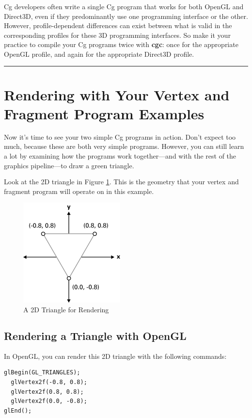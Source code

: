 \documentclass{book}
\begin{document}
Cg developers often write a single Cg program that works for both OpenGL and Direct3D, even if they predominantly use one programming interface or the other. However, profile-dependent differences can exist between what is valid in the corresponding profiles for these 3D programming interfaces. So make it your practice to compile your Cg programs twice with \textbf{cgc}: once for the appropriate OpenGL profile, and again for the appropriate Direct3D profile.
\hrule

\section{Rendering with Your Vertex and Fragment Program Examples}

Now it's time to see your two simple Cg programs in action. Don't expect too much, because these are both very simple programs. However, you can still learn a lot by examining how the programs work together—and with the rest of the graphics pipeline—to draw a green triangle.

Look at the 2D triangle in Figure \ref{fig:2-4}. This is the geometry that your vertex and fragment program will operate on in this example.

\begin{figure}
    \centering
    \includegraphics[width=0.5\linewidth]{Images/fig2_4.jpg}
    \caption{A 2D Triangle for Rendering}
    \label{fig:2-4}
\end{figure}

\subsection{Rendering a Triangle with OpenGL}

In OpenGL, you can render this 2D triangle with the following commands:

\FloatBarrier
\begin{lstlisting}
glBegin(GL_TRIANGLES);
  glVertex2f(-0.8, 0.8);
  glVertex2f(0.8, 0.8);
  glVertex2f(0.0, -0.8);
glEnd();
\end{lstlisting}
\FloatBarrier
\end{document}
